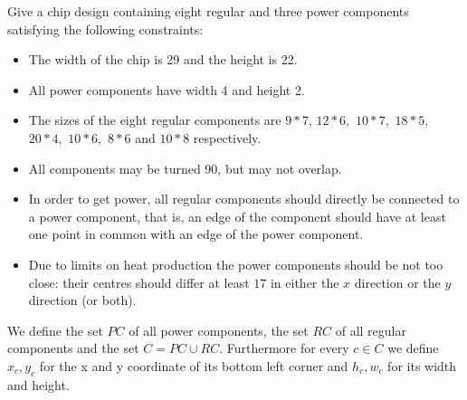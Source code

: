 \documentclass[12pt]{article}
\begin{document}
Give a chip design containing eight regular and three power components 
satisfying the following constraints:
\begin{itemize}
	\item The width of the chip is 29 and the height is 22.
	\item All power components have width 4 and height 2.
	\item The sizes of the eight regular components are $9*7$,
		$12*6,$ $10*7,$ $18*5,$ $20*4,$
		$10*6,$ $8*6$ and $10*8$ respectively.
	\item All components may be turned 90, but may not overlap.
	\item In order to get power, all regular components should directly be
		connected to a power component, that is, an edge of the
		component should have at least one point in common with an edge
		of the power component.
	\item Due to limits on heat production the power components should be
		not too close: their centres should differ at least $17$ in
		either the $x$ direction or the $y$ direction (or both).
\end{itemize}

We define the set $PC$ of all power components, the set $RC$ of all regular
components and the set $C = PC \cup RC$. Furthermore for every $c \in C$ we
define $x_c, y_c$ for the x and y coordinate of its bottom left corner and
$h_c, w_c$ for its width and height. 
\end{document}
